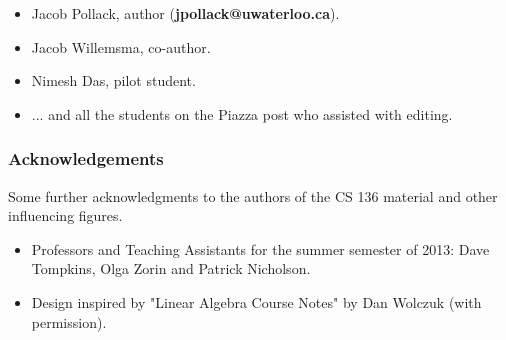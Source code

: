 \begin{itemize}

\item Jacob Pollack, author (\textbf{jpollack@uwaterloo.ca}).
\item Jacob Willemsma, co-author.
\item Nimesh Das, pilot student.
\item ... and all the students on the Piazza post who assisted with editing.

\end{itemize}

\subsubsection*{Acknowledgements}

Some further acknowledgments to the authors of the CS 136 material and other influencing figures.

\begin{itemize}

\item Professors and Teaching Assistants for the summer semester of 2013: Dave Tompkins, Olga Zorin and Patrick Nicholson.
\item Design inspired by "Linear Algebra Course Notes" by Dan Wolczuk (with permission).

\end{itemize}